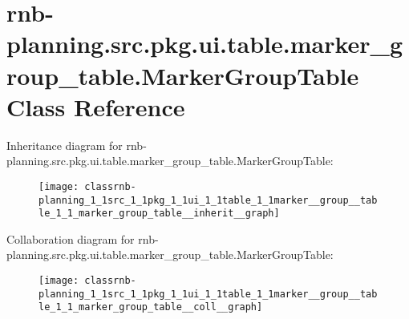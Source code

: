 \hypertarget{classrnb-planning_1_1src_1_1pkg_1_1ui_1_1table_1_1marker__group__table_1_1_marker_group_table}{}\section{rnb-\/planning.src.\+pkg.\+ui.\+table.\+marker\+\_\+group\+\_\+table.\+Marker\+Group\+Table Class Reference}
\label{classrnb-planning_1_1src_1_1pkg_1_1ui_1_1table_1_1marker__group__table_1_1_marker_group_table}


Inheritance diagram for rnb-\/planning.src.\+pkg.\+ui.\+table.\+marker\+\_\+group\+\_\+table.\+Marker\+Group\+Table\+:\nopagebreak
\begin{figure}[H]
\begin{center}
\leavevmode
\texttt{[image: classrnb-planning\_1\_1src\_1\_1pkg\_1\_1ui\_1\_1table\_1\_1marker\_\_group\_\_table\_1\_1\_marker\_group\_table\_\_inherit\_\_graph]}
\end{center}
\end{figure}


Collaboration diagram for rnb-\/planning.src.\+pkg.\+ui.\+table.\+marker\+\_\+group\+\_\+table.\+Marker\+Group\+Table\+:\nopagebreak
\begin{figure}[H]
\begin{center}
\leavevmode
\texttt{[image: classrnb-planning\_1\_1src\_1\_1pkg\_1\_1ui\_1\_1table\_1\_1marker\_\_group\_\_table\_1\_1\_marker\_group\_table\_\_coll\_\_graph]}
\end{center}
\end{figure}
